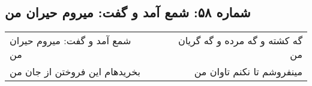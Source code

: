 \begin{center}
\section*{شماره ۵۸: شمع‌ آمد و گفت: میروم حیران من}
\label{sec:058}
\begin{longtable}{l p{0.5cm} r}
شمع‌ آمد و گفت: میروم حیران من
&&
گه کشته و گه مرده و گه گریان من
\\
بخریدهام این فروختن از جان من
&&
مینفروشم تا نکنم تاوان من
\\
\end{longtable}
\end{center}
